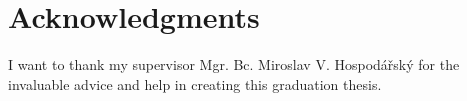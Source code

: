 ﻿\vfill

\section*{Acknowledgments}
I want to thank my supervisor Mgr. Bc. Miroslav V. Hospodářský for the invaluable advice and help in creating this graduation thesis.

\vglue 2cm $ $


